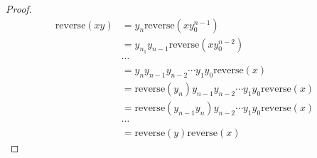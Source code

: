 \documentclass[11pt]{scrartcl}
\makeatletter
\newenvironment{Dequation}
{%
	\def\tagform@##1{%
	\maketag@@@{\makebox[0pt][r]{(\ignorespaces##1\unskip\@@italiccorr)}}}%
	\ignorespaces
}
{%
	\def\tagform@##1{\maketag@@@{(\ignorespaces##1\unskip\@@italiccorr)}}%
	\ignorespacesafterend
}
\makeatother
\begin{document}
\begin{enumerate}[label=\alph*.]
{\begin{proof}
\begin{Dequation}
		\begin{align*}
			\text{reverse}(xy) &= y_n\text{reverse}(xy_0^{n-1})\\
							   &= y_{n_1}y_{n-1}\text{reverse}(xy_0^{n-2})\\
							   & \cdots \\ 
							   &= y_ny_{n-1}y_{n-2} \cdots y_{1} y_{0} \text{reverse}(x)\\
							   &= \text{reverse}(y_n)y_{n-1}y_{n-2} \cdots y_{1} y_{0} \text{reverse}(x)\\
							   &= \text{reverse}(y_{n-1}y_n)y_{n-2} \cdots y_{1} y_{0} \text{reverse}(x)\\
							   & \cdots \\ 
							   &= \text{reverse}(y) \text{reverse}(x)
		\end{align*}
		\end{Dequation}
		\end{proof}
		}
\end{enumerate}
\end{document}
